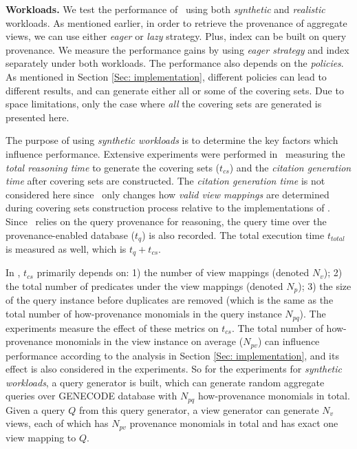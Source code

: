 {\bf Workloads.} 
We test the performance of \provalg\ using both {\em synthetic} and {\em realistic} workloads. As mentioned earlier, in order to retrieve the provenance of aggregate views, we can use either {\em eager} or {\em lazy} strategy. Plus, index can be built on query provenance. We measure the performance gains by using {\em eager strategy} and index separately under both workloads. The performance also depends on the {\em policies}. As mentioned in Section \ref{Sec: implementation}, different policies can lead to different results, and can generate either all or some of the covering sets. Due to space limitations, only the case where {\em all} the covering sets are generated is presented here.

The purpose of using {\em synthetic workloads} is to determine the key factors which influence performance. 
Extensive experiments were performed in~\cite{wu2018data} measuring the \textit{total reasoning time}  to generate the covering sets ($t_{cs}$) and the \textit{citation generation time}   after covering sets are constructed.  The \textit{citation generation time} is not considered here since \provalg\ only changes how {\em valid view mappings} are determined during covering sets construction process %
relative to the implementations of \rba. Since \provalg\ relies on the query provenance for reasoning, the query time over the provenance-enabled database ($t_{q}$) is also recorded. The total execution time $t_{total}$ is measured as well, which is $t_q+t_{cs}$.


In \cite{wu2018data}, $t_{cs}$ primarily depends on: 1) the number of view mappings (denoted $N_v$); 2) the total number of predicates under the view mappings (denoted $N_p$); 3) the size of the query instance before duplicates are removed (which is the same as the total number of how-provenance monomials in the query instance $N_{pq}$). The experiments measure the effect of these metrics on $t_{cs}$. %
The total number of how-provenance monomials in the view instance on average ($N_{pv}$) can influence performance according to the analysis in Section \ref{Sec: implementation}, and its effect is also considered in the experiments. So for the experiments for {\em synthetic workloads}, a query generator is built, which can generate random aggregate queries over GENECODE database with $N_{pq}$ how-provenance monomials in total. Given a query $Q$ from this query generator, a view generator can generate $N_v$ views, each of which has $N_{pv}$ provenance monomials in total and has exact one view mapping to $Q$. 

